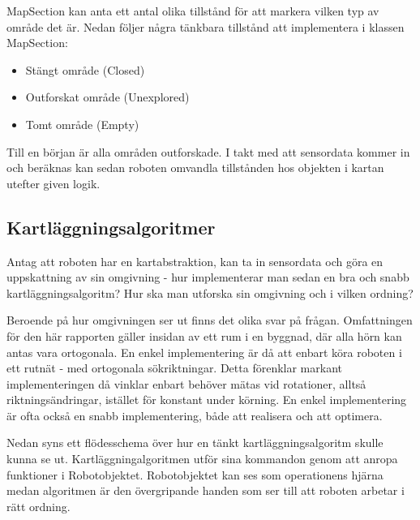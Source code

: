\documentclass[a4paper,12pt,fleqn]{article}
\begin{document}
MapSection kan anta ett antal olika tillstånd för att markera vilken typ av område det är. Nedan följer några tänkbara tillstånd att implementera i klassen MapSection: 

\begin{itemize}
	\item Stängt område (Closed)
	\item Outforskat område (Unexplored)
	\item Tomt område (Empty)
\end{itemize}

Till en början är alla områden outforskade. I takt med att sensordata kommer in och beräknas kan sedan roboten omvandla tillstånden hos objekten i kartan utefter given logik. 


\newpage
\subsection{Kartläggningsalgoritmer}

Antag att roboten har en kartabstraktion, kan ta in sensordata och göra en uppskattning av sin omgivning - hur implementerar man sedan en bra och snabb kartläggningsalgoritm? Hur ska man utforska sin omgivning och i vilken ordning? 

Beroende på hur omgivningen ser ut finns det olika svar på frågan. Omfattningen för den här rapporten gäller insidan av ett rum i en byggnad, där alla hörn kan antas vara ortogonala. En enkel implementering är då att enbart köra roboten i ett rutnät - med ortogonala sökriktningar. Detta förenklar markant implementeringen då vinklar enbart behöver mätas vid rotationer, alltså riktningsändringar, istället för konstant under körning. En enkel implementering är ofta också en snabb implementering, både att realisera och att optimera. 

Nedan syns ett flödesschema över hur en tänkt kartläggningsalgoritm skulle kunna se ut. Kartläggningalgoritmen utför sina kommandon genom att anropa funktioner i Robotobjektet. Robotobjektet kan ses som operationens hjärna medan algoritmen är den övergripande handen som ser till att roboten arbetar i rätt ordning. 
\end{document}
